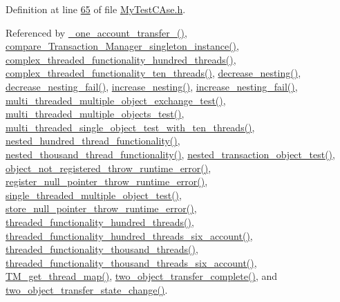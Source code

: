 Definition at line \hyperlink{_my_test_c_ase_8h_source_l00065}{65} of file \hyperlink{_my_test_c_ase_8h_source}{My\+Test\+C\+Ase.\+h}.



Referenced by \hyperlink{_my_test_c_ase_8cpp_source_l00074}{\+\_\+one\+\_\+account\+\_\+transfer\+\_\+()}, \hyperlink{_my_test_c_ase_8cpp_source_l00896}{compare\+\_\+\+Transaction\+\_\+\+Manager\+\_\+singleton\+\_\+instance()}, \hyperlink{_my_test_c_ase_8cpp_source_l00412}{complex\+\_\+threaded\+\_\+functionality\+\_\+hundred\+\_\+threads()}, \hyperlink{_my_test_c_ase_8cpp_source_l00467}{complex\+\_\+threaded\+\_\+functionality\+\_\+ten\+\_\+threads()}, \hyperlink{_my_test_c_ase_8cpp_source_l00853}{decrease\+\_\+nesting()}, \hyperlink{_my_test_c_ase_8cpp_source_l00881}{decrease\+\_\+nesting\+\_\+fail()}, \hyperlink{_my_test_c_ase_8cpp_source_l00841}{increase\+\_\+nesting()}, \hyperlink{_my_test_c_ase_8cpp_source_l00868}{increase\+\_\+nesting\+\_\+fail()}, \hyperlink{_my_test_c_ase_8cpp_source_l00922}{multi\+\_\+threaded\+\_\+multiple\+\_\+object\+\_\+exchange\+\_\+test()}, \hyperlink{_my_test_c_ase_8cpp_source_l01040}{multi\+\_\+threaded\+\_\+multiple\+\_\+objects\+\_\+test()}, \hyperlink{_my_test_c_ase_8cpp_source_l00954}{multi\+\_\+threaded\+\_\+single\+\_\+object\+\_\+test\+\_\+with\+\_\+ten\+\_\+threads()}, \hyperlink{_my_test_c_ase_8cpp_source_l00680}{nested\+\_\+hundred\+\_\+thread\+\_\+functionality()}, \hyperlink{_my_test_c_ase_8cpp_source_l00715}{nested\+\_\+thousand\+\_\+thread\+\_\+functionality()}, \hyperlink{_my_test_c_ase_8cpp_source_l00787}{nested\+\_\+transaction\+\_\+object\+\_\+test()}, \hyperlink{_my_test_c_ase_8cpp_source_l00818}{object\+\_\+not\+\_\+registered\+\_\+throw\+\_\+runtime\+\_\+error()}, \hyperlink{_my_test_c_ase_8cpp_source_l00805}{register\+\_\+null\+\_\+pointer\+\_\+throw\+\_\+runtime\+\_\+error()}, \hyperlink{_my_test_c_ase_8cpp_source_l00983}{single\+\_\+threaded\+\_\+multiple\+\_\+object\+\_\+test()}, \hyperlink{_my_test_c_ase_8cpp_source_l00831}{store\+\_\+null\+\_\+pointer\+\_\+throw\+\_\+runtime\+\_\+error()}, \hyperlink{_my_test_c_ase_8cpp_source_l00523}{threaded\+\_\+functionality\+\_\+hundred\+\_\+threads()}, \hyperlink{_my_test_c_ase_8cpp_source_l00589}{threaded\+\_\+functionality\+\_\+hundred\+\_\+threads\+\_\+six\+\_\+account()}, \hyperlink{_my_test_c_ase_8cpp_source_l00556}{threaded\+\_\+functionality\+\_\+thousand\+\_\+threads()}, \hyperlink{_my_test_c_ase_8cpp_source_l00634}{threaded\+\_\+functionality\+\_\+thousand\+\_\+threads\+\_\+six\+\_\+account()}, \hyperlink{_my_test_c_ase_8cpp_source_l00903}{T\+M\+\_\+get\+\_\+thread\+\_\+map()}, \hyperlink{_my_test_c_ase_8cpp_source_l00748}{two\+\_\+object\+\_\+transfer\+\_\+complete()}, and \hyperlink{_my_test_c_ase_8cpp_source_l00765}{two\+\_\+object\+\_\+transfer\+\_\+state\+\_\+change()}.

